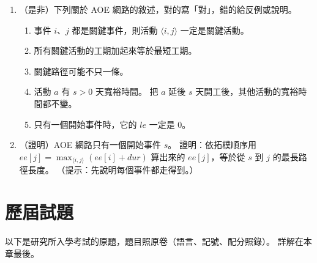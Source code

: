 \begin{enumerate}
\item \label{tps-q-aoe-tf}（是非）下列關於 AOE 網路的敘述，對的寫「對」，錯的給反例或說明。
\begin{enumerate}
\item 事件 $i$、$j$ 都是關鍵事件，則活動 $\langle i, j \rangle$ 一定是關鍵活動。
\item 所有關鍵活動的工期加起來等於最短工期。
\item 關鍵路徑可能不只一條。
\item 活動 $a$ 有 $s > 0$ 天寬裕時間。 把 $a$ 延後 $s$ 天開工後，其他活動的寬裕時間都不變。
\item 只有一個開始事件時，它的 $\mathit{le}$ 一定是 $0$。
\end{enumerate}

\item \label{tps-q-ee}（證明）AOE 網路只有一個開始事件 $s$。 證明：依拓樸順序用
$\mathit{ee}[j] = \max_{\langle i, j \rangle} (\mathit{ee}[i] + \mathit{dur})$ 算出來的
$\mathit{ee}[j]$，等於從 $s$ 到 $j$ 的最長路徑長度。 （提示：先說明每個事件都走得到。）
\end{enumerate}

\tpsneed{11cm}
\section{歷屆試題}
\label{sec:tps-pastexam}

以下是研究所入學考試的原題，題目照原卷（語言、記號、配分照錄）。 詳解在本章最後。

